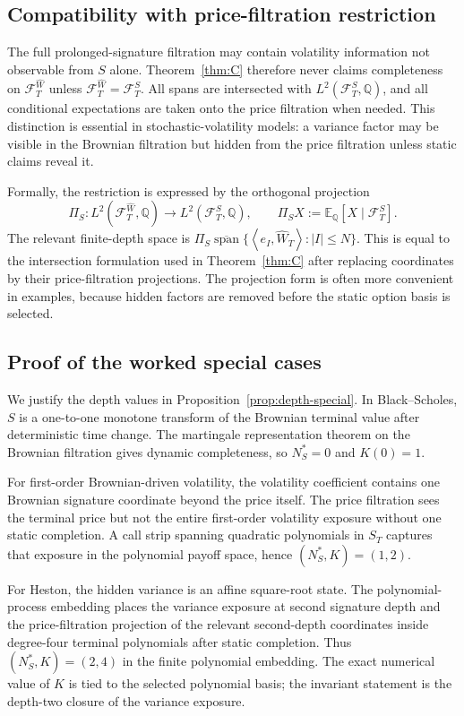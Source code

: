\documentclass[11pt,oneside]{article}
\theoremstyle{plain}
\theoremstyle{definition}
\theoremstyle{remark}
\newcommand{\E}{\mathbb{E}}
\newcommand{\Q}{\mathbb{Q}}
\newcommand{\cW}{\widehat W}
\newcommand{\FWh}{\mathcal F^{\widehat W}}
\newcommand{\FS}{\mathcal F^S}
\newcommand{\inner}[2]{\left\langle #1,#2\right\rangle}
\newcommand{\clspan}{\overline{\operatorname{span}}}
\begin{document}
\subsection{Compatibility with price-filtration restriction}
\label{subsec:price-filtration-restriction}
The full prolonged-signature filtration may contain volatility information not observable from $S$ alone. Theorem~\ref{thm:C} therefore never claims completeness on $\FWh_T$ unless $\FWh_T=\FS_T$. All spans are intersected with $L^2(\FS_T,\Q)$, and all conditional expectations are taken onto the price filtration when needed. This distinction is essential in stochastic-volatility models: a variance factor may be visible in the Brownian filtration but hidden from the price filtration unless static claims reveal it.

Formally, the restriction is expressed by the orthogonal projection
\[
\Pi_S:L^2(\FWh_T,\Q)\to L^2(\FS_T,\Q),
\qquad
\Pi_S X:=\E_\Q[X\mid \FS_T].
\]
The relevant finite-depth space is $\Pi_S\clspan\{\inner{e_I}{\cW_T}: |I|\leq N\}$. This is equal to the intersection formulation used in Theorem~\ref{thm:C} after replacing coordinates by their price-filtration projections. The projection form is often more convenient in examples, because hidden factors are removed before the static option basis is selected.



\subsection{Proof of the worked special cases}
\label{subsec:proof-special-depths}
We justify the depth values in Proposition~\ref{prop:depth-special}. In Black--Scholes, $S$ is a one-to-one monotone transform of the Brownian terminal value after deterministic time change. The martingale representation theorem on the Brownian filtration gives dynamic completeness, so $N_S^\ast=0$ and $K(0)=1$.

For first-order Brownian-driven volatility, the volatility coefficient contains one Brownian signature coordinate beyond the price itself. The price filtration sees the terminal price but not the entire first-order volatility exposure without one static completion. A call strip spanning quadratic polynomials in $S_T$ captures that exposure in the polynomial payoff space, hence $(N_S^\ast,K)=(1,2)$.

For Heston, the hidden variance is an affine square-root state. The polynomial-process embedding places the variance exposure at second signature depth and the price-filtration projection of the relevant second-depth coordinates inside degree-four terminal polynomials after static completion. Thus $(N_S^\ast,K)=(2,4)$ in the finite polynomial embedding. The exact numerical value of $K$ is tied to the selected polynomial basis; the invariant statement is the depth-two closure of the variance exposure.
\end{document}
